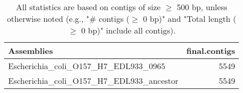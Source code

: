 \documentclass[12pt,a4paper]{article}
\begin{document}
\begin{table}[ht]
\begin{center}
\caption{All statistics are based on contigs of size $\geq$ 500 bp, unless otherwise noted (e.g., "\# contigs ($\geq$ 0 bp)" and "Total length ($\geq$ 0 bp)" include all contigs).}
\begin{tabular}{|l*{1}{|r}|}
\hline
Assemblies & final.contigs \\ \hline
Escherichia\_coli\_O157\_H7\_EDL933\_0965 & 5549 \\ \hline
Escherichia\_coli\_O157\_H7\_EDL933\_ancestor & 5549 \\ \hline
\end{tabular}
\end{center}
\end{table}
\end{document}
